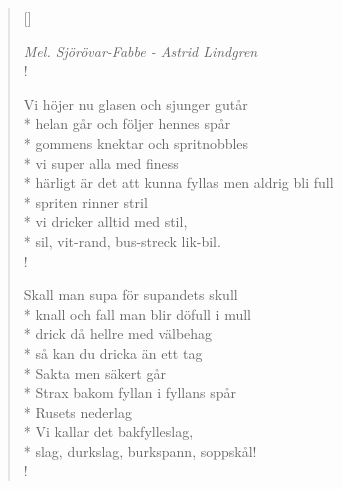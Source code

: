 
\settowidth{\versewidth}{Pappas flickor är dom likaså.}


\begin{verse}[\versewidth]

\flagverse{}
\emph{Mel. Sjörövar-Fabbe - Astrid Lindgren}\\!

Vi höjer nu glasen och sjunger gutår\\*
helan går och följer hennes spår\\*
gommens knektar och spritnobbles\\*
vi super alla med finess\\*
härligt är det att kunna fyllas men aldrig bli full\\*
spriten rinner stril\\*
vi dricker alltid med stil,\\*
sil, vit-rand, bus-streck lik-bil.\\!


Skall man supa för supandets skull\\*
knall och fall man blir döfull i mull\\*
drick då hellre med välbehag\\*
så kan du dricka än ett tag\\*
Sakta men säkert går\\*
Strax bakom fyllan i fyllans spår\\*
Rusets nederlag\\*
Vi kallar det bakfylleslag,\\*
slag, durkslag, burkspann, soppskål!\\!




\end{verse}

